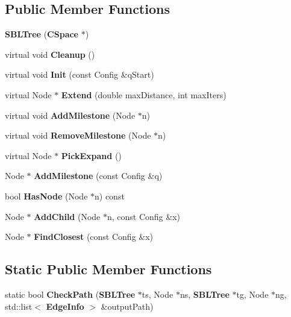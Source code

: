 \subsection*{Public Member Functions}
\begin{DoxyCompactItemize}
\item 
{\bfseries S\+B\+L\+Tree} ({\bf C\+Space} $\ast$)\label{classSBLTree_a367a93a43d7cb01c34136b77b555ca49}

\item 
virtual void {\bfseries Cleanup} ()\label{classSBLTree_ac075223ea0a5f0a01c9df668ead2ecae}

\item 
virtual void {\bfseries Init} (const Config \&q\+Start)\label{classSBLTree_ae14637d72a51bb5fe7e4c98b819cbf90}

\item 
virtual Node $\ast$ {\bfseries Extend} (double max\+Distance, int max\+Iters)\label{classSBLTree_a015ba93ecff317cb1d72eb596e63fe1e}

\item 
virtual void {\bfseries Add\+Milestone} (Node $\ast$n)\label{classSBLTree_a31c4852082df50820fe30c590173b96c}

\item 
virtual void {\bfseries Remove\+Milestone} (Node $\ast$n)\label{classSBLTree_ab58366d9da8aa521389fc2db6a4175ac}

\item 
virtual Node $\ast$ {\bfseries Pick\+Expand} ()\label{classSBLTree_a87a32676fd734538b699b13c9c37b4cf}

\item 
Node $\ast$ {\bfseries Add\+Milestone} (const Config \&q)\label{classSBLTree_a1061a3c9ead4d26572d858c40b3f0ed9}

\item 
bool {\bfseries Has\+Node} (Node $\ast$n) const \label{classSBLTree_aa00f8a31a0590bdb7885693d1f4e7f2b}

\item 
Node $\ast$ {\bfseries Add\+Child} (Node $\ast$n, const Config \&x)\label{classSBLTree_a1699cb550b424bc24e50d6b478fbeca0}

\item 
Node $\ast$ {\bfseries Find\+Closest} (const Config \&x)\label{classSBLTree_a6346a7340ab1316894ef0de334cf2581}

\end{DoxyCompactItemize}
\subsection*{Static Public Member Functions}
\begin{DoxyCompactItemize}
\item 
static bool {\bfseries Check\+Path} ({\bf S\+B\+L\+Tree} $\ast$ts, Node $\ast$ns, {\bf S\+B\+L\+Tree} $\ast$tg, Node $\ast$ng, std\+::list$<$ {\bf Edge\+Info} $>$ \&output\+Path)\label{classSBLTree_ad12520b6429ecf48a836123af2d4f59e}

\end{DoxyCompactItemize}
